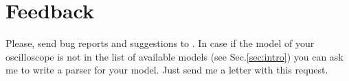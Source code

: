 \newpage
\section{Feedback}\label{sec:feedback}
Please, send bug reports and suggestions to . In case if the
model of your oscilloscope is not in the list of available models (see Sec.\ref{sec:intro}) you can ask me to write a parser for your model. Just send me a letter with this request.
